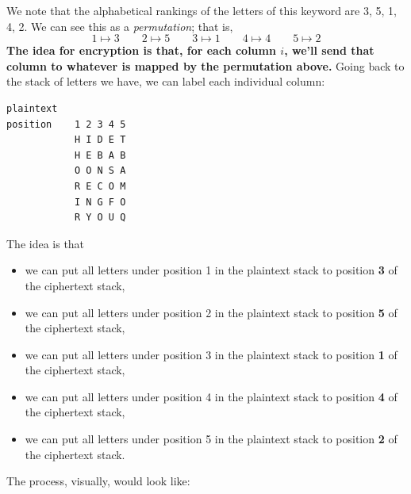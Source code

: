 \documentclass[letterpaper]{article}
\begin{document}
\begin{mdframed}[]
\begin{center}
    \end{center}
    We note that the alphabetical rankings of the letters of this keyword are 3, 5, 1, 4, 2. We can see this as a \emph{permutation}; that is, 
    \[1 \mapsto 3 \qquad 2 \mapsto 5 \qquad 3 \mapsto 1 \qquad 4 \mapsto 4 \qquad 5 \mapsto 2\]
    \textbf{The idea for encryption is that, for each column $i$, we'll send that column to whatever is mapped by the permutation above.} Going back to the stack of letters we have, we can label each individual column:
    \begin{mdframed}
        \begin{verbatim}
plaintext 
position    1 2 3 4 5
            H I D E T
            H E B A B
            O O N S A
            R E C O M
            I N G F O
            R Y O U Q\end{verbatim}
    \end{mdframed}
    The idea is that 
    \begin{itemize}
        \item we can put all letters under position 1 in the plaintext stack to position \textbf{3} of the ciphertext stack, 
        \item we can put all letters under position 2 in the plaintext stack to position \textbf{5} of the ciphertext stack, 
        \item we can put all letters under position 3 in the plaintext stack to position \textbf{1} of the ciphertext stack, 
        \item we can put all letters under position 4 in the plaintext stack to position \textbf{4} of the ciphertext stack, 
        \item we can put all letters under position 5 in the plaintext stack to position \textbf{2} of the ciphertext stack.
    \end{itemize}
    The process, visually, would look like: 
    \begin{center}

\end{center}
\end{mdframed}
\end{document}
